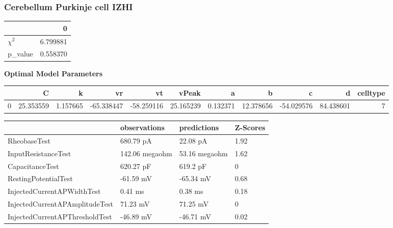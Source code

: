 \subsubsection{Cerebellum Purkinje cell IZHI}\begin{tabular}{lr}
\toprule
{} &         0 \\
\midrule
$\chi^{2}$ &  6.799881 \\
p\_value    &  0.558370 \\
\bottomrule
\end{tabular}
\textbf{Optimal Model Parameters} \begin{tabular}{lrrrrrrrrrr}
\toprule
{} &          C &         k &         vr &         vt &      vPeak &         a &          b &          c &          d &  celltype \\
\midrule
0 &  25.353559 &  1.157665 & -65.338447 & -58.259116 &  25.165239 &  0.132371 &  12.378656 & -54.029576 &  84.438601 &         7 \\
\bottomrule
\end{tabular}
\begin{tabular}{llll}
\toprule
{} &    observations &    predictions & Z-Scores \\
\midrule
RheobaseTest                   &       680.79 pA &       22.08 pA &     1.92 \\
InputResistanceTest            &  142.06 megaohm &  53.16 megaohm &     1.62 \\
CapacitanceTest                &       620.27 pF &       619.2 pF &        0 \\
RestingPotentialTest           &       -61.59 mV &      -65.34 mV &     0.68 \\
InjectedCurrentAPWidthTest     &         0.41 ms &        0.38 ms &     0.18 \\
InjectedCurrentAPAmplitudeTest &        71.23 mV &       71.25 mV &        0 \\
InjectedCurrentAPThresholdTest &       -46.89 mV &      -46.71 mV &     0.02 \\
\bottomrule
\end{tabular}
